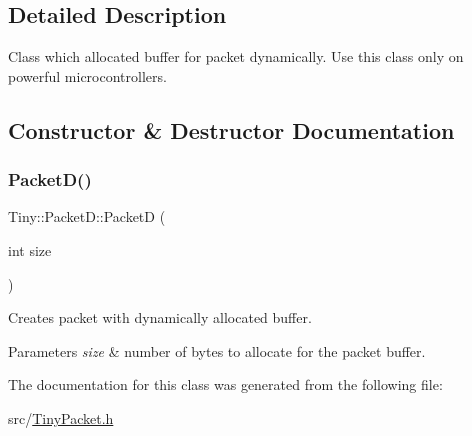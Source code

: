 \subsection{Detailed Description}
Class which allocated buffer for packet dynamically. Use this class only on powerful microcontrollers. 

\subsection{Constructor \& Destructor Documentation}
\mbox{\label{classTiny_1_1PacketD_a337a74c5e513be616aff0c1a0746612a}} 
\subsubsection{\texorpdfstring{Packet\+D()}{PacketD()}}
{\footnotesize\ttfamily Tiny\+::\+Packet\+D\+::\+PacketD (\begin{DoxyParamCaption}\item[{int}]{size }\end{DoxyParamCaption})\hspace{0.3cm}{\ttfamily [inline]}}

Creates packet with dynamically allocated buffer. 
\begin{DoxyParams}{Parameters}
{\em size} & number of bytes to allocate for the packet buffer. \\
\hline
\end{DoxyParams}


The documentation for this class was generated from the following file\+:\begin{DoxyCompactItemize}
\item 
src/\hyperlink{TinyPacket_8h}{Tiny\+Packet.\+h}\end{DoxyCompactItemize}
